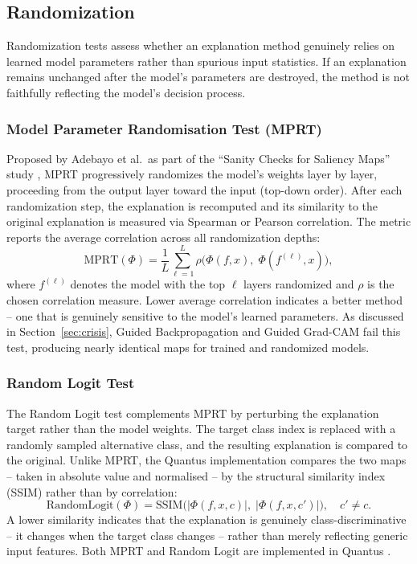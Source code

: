 \subsection{Randomization}
\label{subsec:randomization}
Randomization tests assess whether an explanation method genuinely relies on learned model parameters rather than spurious input statistics. If an explanation remains unchanged after the model's parameters are destroyed, the method is not faithfully reflecting the model's decision process.

\subsubsection{Model Parameter Randomisation Test (MPRT)}
Proposed by Adebayo et al.\ as part of the ``Sanity Checks for Saliency Maps'' study \cite{adebayo2018sanity}, MPRT progressively randomizes the model's weights layer by layer, proceeding from the output layer toward the input (top-down order). After each randomization step, the explanation is recomputed and its similarity to the original explanation is measured via Spearman or Pearson correlation. The metric reports the average correlation across all randomization depths:
\begin{equation}
    \text{MPRT}(\Phi) = \frac{1}{L} \sum_{\ell=1}^{L} \rho\bigl(\Phi(f, x),\; \Phi(f^{(\ell)}, x)\bigr),
\end{equation}
where $f^{(\ell)}$ denotes the model with the top $\ell$ layers randomized and $\rho$ is the chosen correlation measure. Lower average correlation indicates a better method -- one that is genuinely sensitive to the model's learned parameters. As discussed in Section~\ref{sec:crisis}, Guided Backpropagation and Guided Grad-CAM fail this test, producing nearly identical maps for trained and randomized models.

\subsubsection{Random Logit Test}
The Random Logit test complements MPRT by perturbing the explanation target rather than the model weights. The target class index is replaced with a randomly sampled alternative class, and the resulting explanation is compared to the original. Unlike MPRT, the Quantus implementation compares the two maps -- taken in absolute value and normalised -- by the structural similarity index (SSIM) rather than by correlation:
\begin{equation}
    \text{RandomLogit}(\Phi) = \mathrm{SSIM}\bigl(|\Phi(f, x, c)|,\; |\Phi(f, x, c')|\bigr), \quad c' \neq c.
\end{equation}
A lower similarity indicates that the explanation is genuinely class-discriminative -- it changes when the target class changes -- rather than merely reflecting generic input features. Both MPRT and Random Logit are implemented in Quantus \cite{hedstrom2023quantus}.


